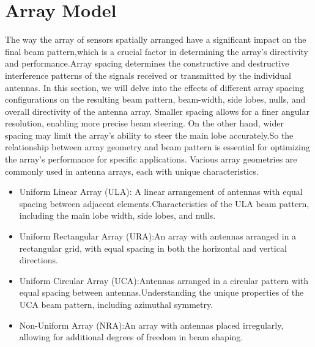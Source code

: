 \section{ Array Model}
The way the array of sensors spatially arranged have  a significant impact on the final beam pattern,which is a crucial factor in determining the array's directivity and performance.Array spacing determines the constructive and destructive interference patterns of the signals received or transmitted by the individual antennas. In this section, we will delve into the effects of different array spacing configurations on the resulting beam pattern, beam-width, side lobes, nulls, and overall directivity of the antenna array. Smaller spacing allows for a finer angular resolution, enabling more precise beam steering. On the other hand, wider spacing may limit the array's ability to steer the main lobe accurately.So the relationship between array geometry and beam pattern is essential for optimizing the array's performance for specific applications.
Various array geometries are commonly used in antenna arrays, each with unique characteristics.
\begin{itemize}
\item Uniform Linear Array (ULA): A linear arrangement of antennas with equal spacing between adjacent elements.Characteristics of the ULA beam pattern, including the main lobe width, side lobes, and nulls.
\item Uniform Rectangular Array (URA):An array with antennas arranged in a rectangular grid, with equal spacing in both the horizontal and vertical directions.
\item Uniform Circular Array (UCA):Antennas arranged in a circular pattern with equal spacing between antennas.Understanding the unique properties of the UCA beam pattern, including azimuthal symmetry.
\item Non-Uniform Array (NRA):An array with antennas placed irregularly, allowing for additional degrees of freedom in beam shaping.
\end{itemize}

